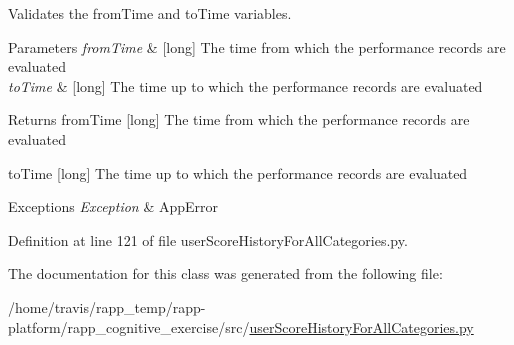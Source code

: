 Validates the from\-Time and to\-Time variables. 


\begin{DoxyParams}{Parameters}
{\em from\-Time} & \mbox{[}long\mbox{]} The time from which the performance records are evaluated \\
\hline
{\em to\-Time} & \mbox{[}long\mbox{]} The time up to which the performance records are evaluated\\
\hline
\end{DoxyParams}
\begin{DoxyReturn}{Returns}
from\-Time \mbox{[}long\mbox{]} The time from which the performance records are evaluated 

to\-Time \mbox{[}long\mbox{]} The time up to which the performance records are evaluated 
\end{DoxyReturn}

\begin{DoxyExceptions}{Exceptions}
{\em Exception} & App\-Error \\
\hline
\end{DoxyExceptions}


Definition at line 121 of file user\-Score\-History\-For\-All\-Categories.\-py.



The documentation for this class was generated from the following file\-:\begin{DoxyCompactItemize}
\item 
/home/travis/rapp\-\_\-temp/rapp-\/platform/rapp\-\_\-cognitive\-\_\-exercise/src/\hyperlink{userScoreHistoryForAllCategories_8py}{user\-Score\-History\-For\-All\-Categories.\-py}\end{DoxyCompactItemize}
